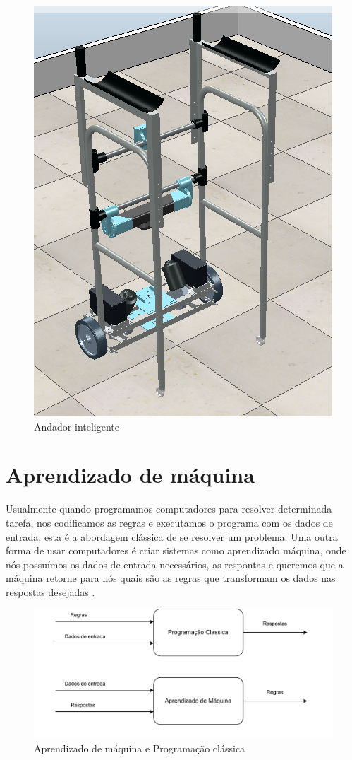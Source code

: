 \begin{figure}[H]
    \centering
    \includegraphics[scale=0.4]{figuras/smart_walker.png}
    \caption{Andador inteligente}
\end{figure}

\section{Aprendizado de máquina}
Usualmente quando programamos computadores para
resolver determinada tarefa, nos codificamos as regras e
executamos o programa com os dados de entrada, esta é a abordagem clássica
de se resolver um problema. Uma outra forma de usar computadores
é criar sistemas como aprendizado máquina, onde nós possuímos os
dados de entrada necessários, as respontas e queremos que a máquina retorne
para nós quais são as regras que transformam os dados nas respostas
desejadas \cite{chollet2021deep}.

\begin{figure}[H]
    \centering
    \includegraphics[scale=0.7]{figuras/machine_learning_diagram.pdf}
    \caption{Aprendizado de máquina e Programação clássica}
\end{figure}


